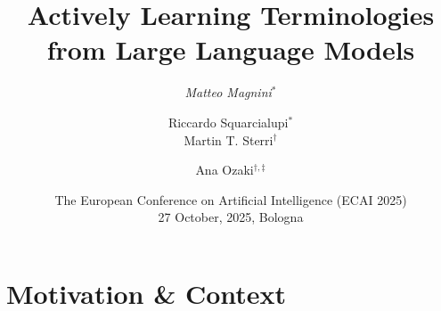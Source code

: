 \documentclass[handout]{beamer}\mode<handout>{\usetheme{AMSBolognaFC}}
\title[Learning \EL Terminologies from LLMs]{
    Actively Learning \EL Terminologies
    \\
    from Large Language Models
}
\author[Magnini et al.]{
	\emph{Matteo Magnini}$^{*}$ %
	\and 
	Riccardo Squarcialupi$^{*}$
	\\
	Martin T. Sterri$^{\dagger}$
	\and
	Ana Ozaki$^{\dagger,\ddagger}$
}
\institute[UniBo, Uni*]{
    $^{*}$%
    \textsc{Alma Mater Studiorum} -- University of Bologna
    \\
    \texttt{
        \emph{matteo.magnini}@unibo.it, riccard.squarcialupi@studio.unibo.it
    }
    \vspace{.3cm}
    \\
    $^{\dagger}$University of Bergen
    \\
    \texttt{
        martin.sterri@student.uib.no, ana.ozaki@uib.no
    }
    \vspace{.3cm}
    \\
    $^{\ddagger}$University of Oslo
    \\
    \texttt{
        anaoz@ifi.uio.no
    }
}
\date[ECAI, 2025]{
	The European Conference on Artificial Intelligence (ECAI 2025)
	\\
	27 October, 2025, Bologna
}
\begin{document}

\frame{\titlepage}

\section{Motivation \& Context}
\end{document}
